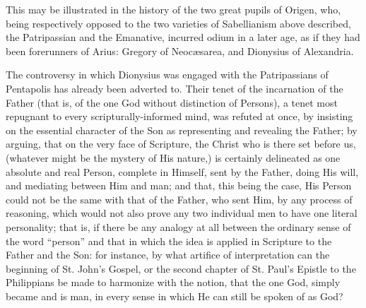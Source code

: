 This may be illustrated in the history of the two great pupils of
Origen, who, being respectively opposed to the two varieties of
Sabellianism above described, the Patripassian and the Emanative,
incurred odium in a later age, as if they had been forerunners of
Arius: Gregory of Neocæsarea, and Dionysius of Alexandria.

The controversy in which Dionysius was engaged with the
Patripassians of Pentapolis has already been adverted to. Their tenet
of the incarnation of the Father (that is, of the one God without
distinction of Persons), a tenet most repugnant to every scripturally-informed
mind, was refuted at once, by insisting on the essential
character of the Son as representing and revealing the Father; by
arguing, that on the very face of Scripture, the Christ who is there
set before us, (whatever might be the mystery of His nature,) is
certainly delineated as one absolute and real Person, complete in
Himself, sent by the Father, doing His will, and mediating between Him
and man; and that, this being the case, His Person could not be the
same with that of the Father, who sent Him, by any process of
reasoning, which would not also prove any two individual men to have
one literal personality; that is, if there be any analogy at all
between the ordinary sense of the word ``person'' and that in
which the idea is applied in Scripture to the Father and the Son: for
instance, by what artifice of interpretation can the beginning of St.
John's Gospel, or the second chapter of St. Paul's Epistle to the
Philippians be made to harmonize with the notion, that the one God,
simply became and is man, in every sense in which He can still be
spoken of as God?

